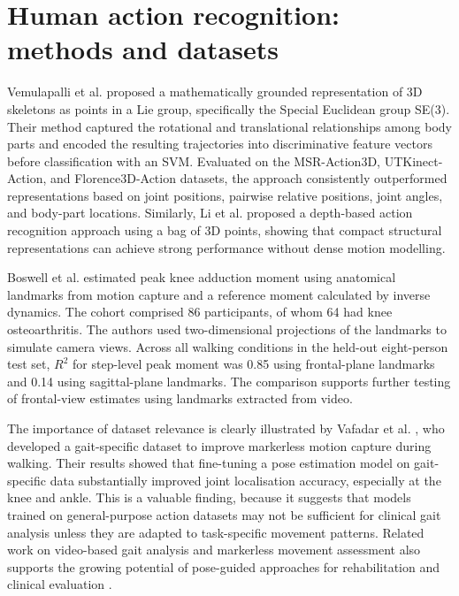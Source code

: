 \documentclass[12pt]{elsarticle}
\begin{document}
\section{Human action recognition: methods and datasets}
\label{supp:S4}
Vemulapalli et al. \cite{vemulapalli2014human} proposed a mathematically grounded representation of 3D skeletons as points in a Lie group, specifically the Special Euclidean group SE(3). Their method captured the rotational and translational relationships among body parts and encoded the resulting trajectories into discriminative feature vectors before classification with an SVM. Evaluated on the MSR-Action3D, UTKinect-Action, and Florence3D-Action datasets, the approach consistently outperformed representations based on joint positions, pairwise relative positions, joint angles, and body-part locations. Similarly, Li et al. \cite{li2010action} proposed a depth-based action recognition approach using a bag of 3D points, showing that compact structural representations can achieve strong performance without dense motion modelling.

\begin{revision}
Boswell et al. \cite{boswell2021neural} estimated peak knee adduction moment using anatomical landmarks from motion capture and a reference moment calculated by inverse dynamics. The cohort comprised 86 participants, of whom 64 had knee osteoarthritis. The authors used two-dimensional projections of the landmarks to simulate camera views. Across all walking conditions in the held-out eight-person test set, $R^2$ for step-level peak moment was 0.85 using frontal-plane landmarks and 0.14 using sagittal-plane landmarks. The comparison supports further testing of frontal-view estimates using landmarks extracted from video.
\end{revision}

The importance of dataset relevance is clearly illustrated by Vafadar et al. \cite{vafadar2021novel}, who developed a gait-specific dataset to improve markerless motion capture during walking. Their results showed that fine-tuning a pose estimation model on gait-specific data substantially improved joint localisation accuracy, especially at the knee and ankle. This is a valuable finding, because it suggests that models trained on general-purpose action datasets may not be sufficient for clinical gait analysis unless they are adapted to task-specific movement patterns. Related work on video-based gait analysis and markerless movement assessment also supports the growing potential of pose-guided approaches for rehabilitation and clinical evaluation \cite{prakash2018vision,lv2022analysis,armstrong2022novel,stenum2024clinical}.
\end{document}
